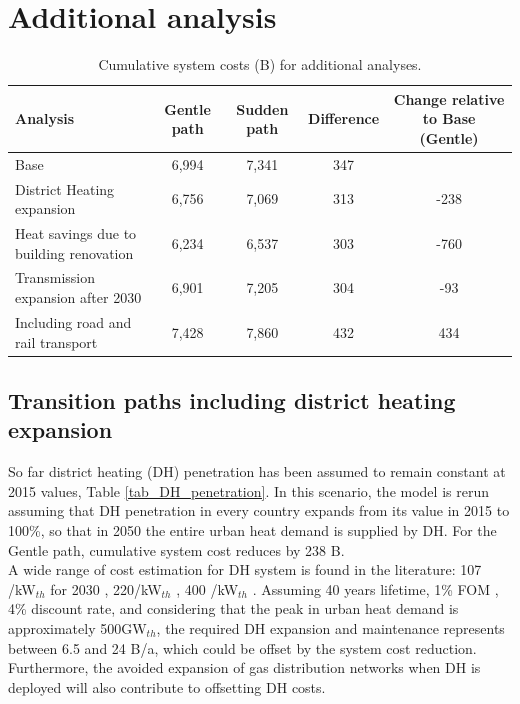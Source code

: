 \documentclass[3p]{elsarticle} %
\begin{document}
\FloatBarrier
\section{Additional analysis}
\begin{table}[!h]
\footnotesize
\centering
\begin{threeparttable}
\caption{Cumulative system costs (B\EUR) for additional analyses.} \label{tab_additional_analyses}
\centering
\begin{tabularx}{17cm}{lcccc}
\toprule
Analysis & Gentle path & Sudden path & Difference & Change relative to Base (Gentle) \\
\midrule
Base	& 6,994	& 7,341	& 347 & \\
District Heating expansion	& 6,756	& 7,069	& 313 & -238 \\
Heat savings due to building renovation	& 6,234	& 6,537	& 303 & -760 \\
Transmission expansion after 2030 & 6,901 &	7,205	& 304 & -93 \\
Including road and rail transport &	7,428	& 7,860 &	432 & 434  \\
\bottomrule
\end{tabularx}
\end{threeparttable}
\end{table}

\subsection{Transition paths including district heating expansion} \label{sec_DH_exp}

So far district heating (DH) penetration has been assumed to remain constant at 2015 values, Table \ref{tab_DH_penetration}. In this scenario, the model is rerun assuming that DH penetration in every country expands from its value in 2015  to 100\%, so that in 2050 the entire urban heat demand is supplied by DH. For the Gentle path, cumulative system cost reduces by 238 B\EUR. \\

A wide range of cost estimation for DH system is found in the literature: 107 \EUR/kW$_{th}$ for 2030 \cite{in-depth-data}, 220\EUR/kW$_{th}$ \cite{Gerhardt_2015}, 400 \EUR/kW$_{th}$ \cite{Sterchele_2020}. Assuming 40 years lifetime, 1\% FOM \cite{Sterchele_2020}, 4\% discount rate,  and considering that the peak in urban heat demand is approximately 500GW$_{th}$, the required DH expansion and maintenance represents between 6.5 and 24 B\EUR/a, which could be offset by the system cost reduction.  Furthermore, the avoided expansion of gas distribution networks when DH is deployed will also contribute to offsetting DH costs. 
\end{document}
